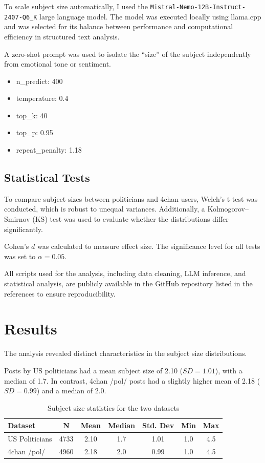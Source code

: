 \documentclass{article}
\begin{document}
To scale subject size automatically, I used the 
\texttt{Mistral-Nemo-12B-Instruct-2407-Q6\_K} large language model.
The model was executed locally using llama.cpp and was selected for its balance between performance and computational efficiency in structured text analysis.

A zero-shot prompt was used to isolate the ``size'' of the subject 
independently from emotional tone or sentiment.

\begin{itemize}
\item n\_predict: 400
\item temperature: 0.4
\item top\_k: 40
\item top\_p: 0.95
\item repeat\_penalty: 1.18
\end{itemize}

\subsection{Statistical Tests}

To compare subject sizes between politicians and 4chan users, 
Welch's t-test was conducted, which is robust to unequal variances. 
Additionally, a Kolmogorov–Smirnov (KS) test was used to evaluate 
whether the distributions differ significantly.

Cohen's $d$ was calculated to measure effect size. The significance 
level for all tests was set to $\alpha = 0.05$.

All scripts used for the analysis, including data cleaning,
LLM inference, and statistical analysis, are publicly available
in the GitHub repository listed in the references to ensure
reproducibility.

\section{Results}

The analysis revealed distinct characteristics in the subject size distributions.

Posts by US politicians had a mean subject size of 2.10 ($SD = 1.01$), 
with a median of 1.7. In contrast, 4chan /pol/ posts had a slightly higher 
mean of 2.18 ($SD = 0.99$) and a median of 2.0.

\begin{table}[h]
\centering
\begin{tabular}{lcccccc}
\hline
Dataset & N & Mean & Median & Std. Dev & Min & Max \\
\hline
US Politicians & 4733 & 2.10 & 1.7 & 1.01 & 1.0 & 4.5 \\
4chan /pol/ & 4960 & 2.18 & 2.0 & 0.99 & 1.0 & 4.5 \\
\hline
\end{tabular}
\caption{Subject size statistics for the two datasets}
\end{table}
\end{document}
